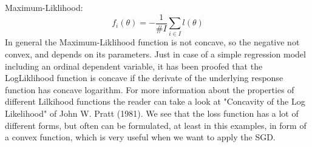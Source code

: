 \documentclass{article}
\begin{document}
Maximum-Liklihood:
\begin{equation} 
f_i(\theta) = - \frac{1}{\#I} \sum_{i \in I} l(\theta)
\end{equation}
In general the Maximum-Liklihood function is not concave, so the negative not convex, and depends on its parameters. Just in case of a simple regression model including an ordinal dependent variable, it has been proofed that the LogLiklihood function is concave if the derivate of the underlying response function has concave logarithm. For more information about the properties of different Lilkihood functions the reader can take a look at "Concavity of the Log Likelihood" of John W. Pratt (1981)\cite{doi:10.1080/01621459.1981.10477613}. We see that the loss function has a lot of different forms, but often can be formulated, at least in this examples, in form of a convex function, which is very useful when we want to apply the SGD.
\end{document}
